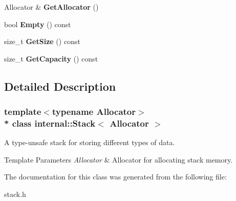 \begin{DoxyCompactItemize}
\item 
Allocator \& {\bfseries Get\+Allocator} ()\hypertarget{a00283_ab01f693833dfe136f574d66547623cfa}{}\label{a00283_ab01f693833dfe136f574d66547623cfa}

\item 
bool {\bfseries Empty} () const \hypertarget{a00283_abf57d1c7b356d8acbbe0e79147ca4b5c}{}\label{a00283_abf57d1c7b356d8acbbe0e79147ca4b5c}

\item 
size\+\_\+t {\bfseries Get\+Size} () const \hypertarget{a00283_ade4a25fa82950619652a30aa3a807f58}{}\label{a00283_ade4a25fa82950619652a30aa3a807f58}

\item 
size\+\_\+t {\bfseries Get\+Capacity} () const \hypertarget{a00283_a61dea1ed780c07bb438d17c581ab0e48}{}\label{a00283_a61dea1ed780c07bb438d17c581ab0e48}

\end{DoxyCompactItemize}


\subsection{Detailed Description}
\subsubsection*{template$<$typename Allocator$>$\\*
class internal\+::\+Stack$<$ Allocator $>$}

A type-\/unsafe stack for storing different types of data. 


\begin{DoxyTemplParams}{Template Parameters}
{\em Allocator} & Allocator for allocating stack memory. \\
\hline
\end{DoxyTemplParams}


The documentation for this class was generated from the following file\+:\begin{DoxyCompactItemize}
\item 
stack.\+h\end{DoxyCompactItemize}

